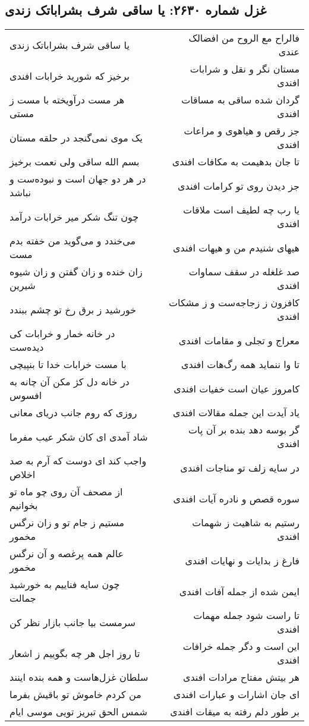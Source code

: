 \begin{center}
\section*{غزل شماره ۲۶۳۰: یا ساقی شرف بشراباتک زندی}
\label{sec:2630}
\begin{longtable}{l p{0.5cm} r}
یا ساقی شرف بشراباتک زندی
&&
فالراح مع الروح من افضالک عندی
\\
برخیز که شورید خرابات افندی
&&
مستان نگر و نقل و شرابات افندی
\\
هر مست درآویخته با مست ز مستی
&&
گردان شده ساقی به مساقات افندی
\\
یک موی نمی‌گنجد در حلقه مستان
&&
جز رقص و هیاهوی و مراعات افندی
\\
بسم الله ساقی ولی نعمت برخیز
&&
تا جان بدهیمت به مکافات افندی
\\
در هر دو جهان است و نبوده‌ست و نباشد
&&
جز دیدن روی تو کرامات افندی
\\
چون تنگ شکر میر خرابات درآمد
&&
یا رب چه لطیف است ملاقات افندی
\\
می‌خندد و می‌گوید من خفته بدم مست
&&
هیهای شنیدم من و هیهات افندی
\\
زان خنده و زان گفتن و زان شیوه شیرین
&&
صد غلغله در سقف سماوات افندی
\\
خورشید ز برق رخ تو چشم ببندد
&&
کافزون ز زجاجه‌ست و ز مشکات افندی
\\
در خانه خمار و خرابات کی دیده‌ست
&&
معراج و تجلی و مقامات افندی
\\
با مست خرابات خدا تا بنپیچی
&&
تا وا ننماید همه رگ‌هات افندی
\\
در خانه دل کژ مکن آن چانه به افسوس
&&
کامروز عیان است خفیات افندی
\\
روزی که روم جانب دریای معانی
&&
یاد آیدت این جمله مقالات افندی
\\
شاد آمدی ای کان شکر عیب مفرما
&&
گر بوسه دهد بنده بر آن پات افندی
\\
واجب کند ای دوست که آرم به صد اخلاص
&&
در سایه زلف تو مناجات افندی
\\
از مصحف آن روی چو ماه تو بخوانیم
&&
سوره قصص و نادره آیات افندی
\\
مستیم ز جام تو و زان نرگس مخمور
&&
رستیم به شاهیت ز شهمات افندی
\\
عالم همه پرغصه و آن نرگس مخمور
&&
فارغ ز بدایات و نهایات افندی
\\
چون سایه فناییم به خورشید جمالت
&&
ایمن شده از جمله آفات افندی
\\
سرمست بیا جانب بازار نظر کن
&&
تا راست شود جمله مهمات افندی
\\
تا روز اجل هر چه بگوییم ز اشعار
&&
این است و دگر جمله خرافات افندی
\\
سلطان غزل‌هاست و همه بنده اینند
&&
هر بیتش مفتاح مرادات افندی
\\
من کردم خاموش تو باقیش بفرما
&&
ای جان اشارات و عبارات افندی
\\
شمس الحق تبریز تویی موسی ایام
&&
بر طور دلم رفته به میقات افندی
\\
\end{longtable}
\end{center}
